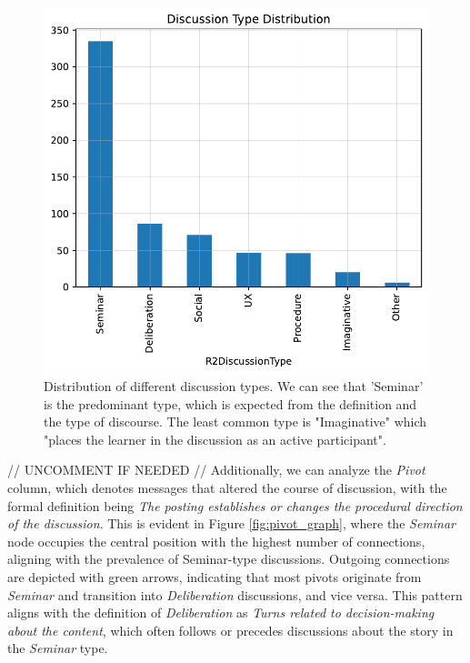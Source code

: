 \documentclass[fleqn,moreauthors,10pt]{ds_report}
\begin{document}
\begin{figure}[ht!]\centering
	\includegraphics[scale=0.5]{fig/discussion_type_distribution.pdf}
	\caption{Distribution of different discussion types. We can see that 'Seminar' is the predominant type, which is expected from the definition and the type of discourse. The least common type is "Imaginative" which "places the learner in the discussion as an active participant".  }
	\label{fig:distr}
\end{figure}


\iffalse
// UNCOMMENT IF NEEDED //
Additionally, we can analyze the \textit{Pivot} column, which denotes messages that altered the course of discussion, with the formal definition being \textit{The posting establishes or changes the procedural direction of the discussion}. This is evident in Figure \ref{fig:pivot_graph}, where the \textit{Seminar} node occupies the central position with the highest number of connections, aligning with the prevalence of Seminar-type discussions. Outgoing connections are depicted with green arrows, indicating that most pivots originate from \textit{Seminar} and transition into \textit{Deliberation} discussions, and vice versa. This pattern aligns with the definition of \textit{Deliberation} as \textit{Turns related to decision-making about the content}, which often follows or precedes discussions about the story in the \textit{Seminar} type.
 
\end{document}
